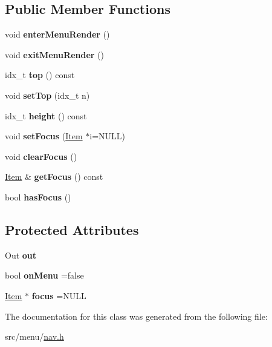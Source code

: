 \subsection*{Public Member Functions}
\begin{DoxyCompactItemize}
\item 
\mbox{\label{classNavBase_ad068d1f5452270687488fdf9f545cf0a}} 
void {\bfseries enter\+Menu\+Render} ()
\item 
\mbox{\label{classNavBase_a835de9effe2a6ceeb436bd3d82062702}} 
void {\bfseries exit\+Menu\+Render} ()
\item 
\mbox{\label{classNavBase_a5b46d1597bd8b2f854d32b51eec4a48b}} 
idx\+\_\+t {\bfseries top} () const
\item 
\mbox{\label{classNavBase_a09963109c81e772d2ef3c8cbc3673b9a}} 
void {\bfseries set\+Top} (idx\+\_\+t n)
\item 
\mbox{\label{classNavBase_ac978614a7f5571311a306ad60f4f9fd4}} 
idx\+\_\+t {\bfseries height} () const
\item 
\mbox{\label{classNavBase_a3fc30c3deb16c42b1e77857d255795c7}} 
void {\bfseries set\+Focus} (\hyperlink{structItem}{Item} $\ast$i=N\+U\+LL)
\item 
\mbox{\label{classNavBase_a2ef0ae3b212cf55b918230dfc1219061}} 
void {\bfseries clear\+Focus} ()
\item 
\mbox{\label{classNavBase_a32191c597356ae31ad2dda39c0e66e69}} 
\hyperlink{structItem}{Item} \& {\bfseries get\+Focus} () const
\item 
\mbox{\label{classNavBase_aad13dfc1f1b015f0b466ae8d2e7e4098}} 
bool {\bfseries has\+Focus} ()
\end{DoxyCompactItemize}
\subsection*{Protected Attributes}
\begin{DoxyCompactItemize}
\item 
\mbox{\label{classNavBase_acf44c6a26a5a681ccc3e5799b557ff82}} 
Out {\bfseries out}
\item 
\mbox{\label{classNavBase_ab6190d55f74f9f6e8cdd93c9f840df02}} 
bool {\bfseries on\+Menu} =false
\item 
\mbox{\label{classNavBase_a5082aa4acb807202c1e049c16c8e6203}} 
\hyperlink{structItem}{Item} $\ast$ {\bfseries focus} =N\+U\+LL
\end{DoxyCompactItemize}


The documentation for this class was generated from the following file\+:\begin{DoxyCompactItemize}
\item 
src/menu/\hyperlink{nav_8h}{nav.\+h}\end{DoxyCompactItemize}
